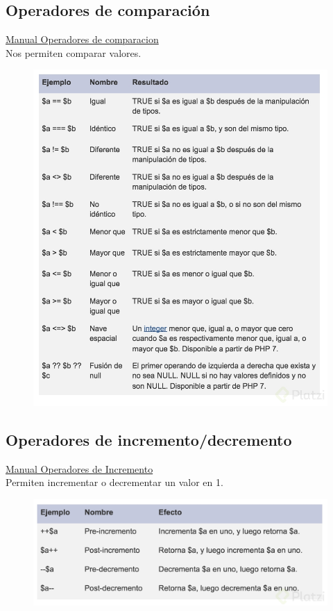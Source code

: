 \documentclass{article}
\begin{document}
\subsection*{Operadores de comparación}%
\href{http://php.net/manual/es/language.operators.comparison.php}{Manual Operadores de comparacion}\\
Nos permiten comparar valores.

\begin{figure}[h!]
  \centering
  \includegraphics[scale=0.4]{./Pictures/023_operadores.jpg}
\end{figure}

\subsection*{Operadores de incremento/decremento}%
\href{http://php.net/manual/es/language.operators.increment.php}{Manual Operadores de Incremento}\\
Permiten incrementar o decrementar un valor en 1.\\

\begin{figure}[h!]
  \centering
  \includegraphics[scale=0.3]{./Pictures/024_operadores.jpg}
\end{figure}
\end{document}
